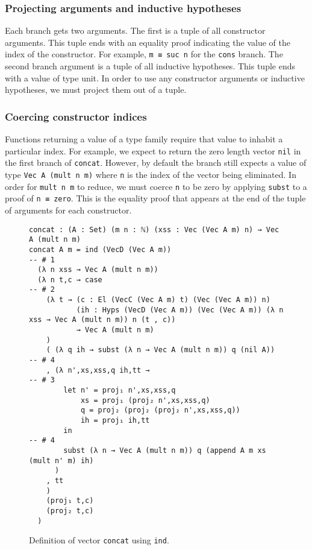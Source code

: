 \documentclass[preprint,nonatbib]{sigplanconf}
\begin{document}
\subsubsection{Projecting arguments and inductive hypotheses}
Each branch gets two arguments. The first is a tuple of all
constructor arguments. This tuple ends with an equality proof
indicating the value of the index of the constructor. For example,
{\tt m ≡ suc n} for the {\tt cons} branch. The second branch argument
is a tuple of all inductive hypotheses. This tuple ends with a value
of type unit. In order to use any constructor arguments or inductive
hypotheses, we must project them out of a tuple.

\subsubsection{Coercing constructor indices}
Functions returning a value of a type family require that value to
inhabit a particular index. For example, we expect to return the zero
length vector {\tt nil} in the first branch of {\tt concat}.
However, by default the branch still expects a value of type
{\tt Vec A (mult n m)} where {\tt n} is the index of the vector being
eliminated. In order for {\tt mult n m} to reduce, we must coerce {\tt n}
to be zero by applying {\tt subst} to a proof of {\tt n ≡ zero}. This
is the equality proof that appears at the end of the tuple of
arguments for each constructor.


\begin{figure*}
\caption{Definition of vector {\tt concat} using {\tt ind}.}
\label{fig:ind:concat}

\begin{verbatim}
concat : (A : Set) (m n : ℕ) (xss : Vec (Vec A m) n) → Vec A (mult n m)
concat A m = ind (VecD (Vec A m))                              -- # 1
  (λ n xss → Vec A (mult n m))
  (λ n t,c → case                                              -- # 2
    (λ t → (c : El (VecC (Vec A m) t) (Vec (Vec A m)) n)
           (ih : Hyps (VecD (Vec A m)) (Vec (Vec A m)) (λ n xss → Vec A (mult n m)) n (t , c))
           → Vec A (mult n m)
    )
    ( (λ q ih → subst (λ n → Vec A (mult n m)) q (nil A))     -- # 4
    , (λ n',xs,xss,q ih,tt →                                  -- # 3
        let n' = proj₁ n',xs,xss,q
            xs = proj₁ (proj₂ n',xs,xss,q)
            q = proj₂ (proj₂ (proj₂ n',xs,xss,q))
            ih = proj₁ ih,tt
        in                                                     -- # 4
        subst (λ n → Vec A (mult n m)) q (append A m xs (mult n' m) ih)
      )
    , tt
    )
    (proj₁ t,c)
    (proj₂ t,c)
  )
\end{verbatim}

\end{figure*}
\end{document}
